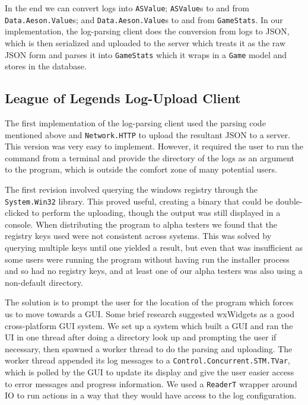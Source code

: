 \documentclass[letterpaper,twocolumn,9pt]{article}
\newcommand{\code}[1]{\texttt{#1}}
\begin{document}
In the end we can convert logs into \code{ASValue}; \code{ASValue}s to and from \code{Data.Aeson.Value}s; and \code{Data.Aeson.Value}s to and from \code{GameStats}.  In our implementation, the log-parsing client does the conversion from logs to JSON, which is then serialized and uploaded to the server which treats it as the raw JSON form and parses it into \code{GameStats} which it wraps in a \code{Game} model and stores in the database.

\subsection{League of Legends Log-Upload Client}

The first implementation of the log-parsing client used the parsing code mentioned above and \code{Network.HTTP} to upload the resultant JSON to a server.  This version was very easy to implement.  However, it required the user to run the command from a terminal and provide the directory of the logs as an argument to the program, which is outside the comfort zone of many potential users.

The first revision involved querying the windows registry through the \code{System.Win32} library.  This proved useful, creating a binary that could be double-clicked to perform the uploading, though the output was still displayed in a console.  When distributing the program to alpha testers we found that the registry keys used were not consistent across systems.  This was solved by querying multiple keys until one yielded a result, but even that was insufficient as some users were running the program without having run the installer process and so had no registry keys, and at least one of our alpha testers was also using a non-default directory.

The solution is to prompt the user for the location of the program which forces us to move towards a GUI.  Some brief research suggested wxWidgets as a good cross-platform GUI system.  We set up a system which built a GUI and ran the UI in one thread after doing a directory look up and prompting the user if necessary, then spawned a worker thread to do the parsing and uploading.  The worker thread appended its log messages to a \code{Control.Concurrent.STM.TVar}, which is polled by the GUI to update its display and give the user easier access to error messages and progress information.  We used a \code{ReaderT} wrapper around IO to run actions in a way that they would have access to the log configuration.
\end{document}
